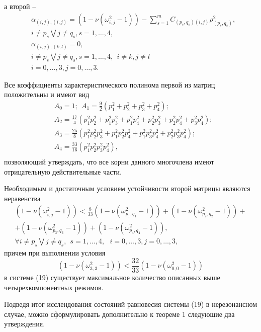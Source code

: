 \documentclass[12pt]{article}  %
\begin{document}
а второй \---
\begin{equation}
\begin{split}
&\alpha_{(i,j),(i,j)} = (1-\nu(\omega^2_{i,j}-1)) - \sum_{s=1}^{m}C_{(p_s,q_s)(i,j)}\rho^2_{(p_s,q_s)}, \\
&i\not=p_s \bigvee j\not=q_s, s=1,\dots,4,\\
&\alpha_{(i,j),(k,l)}=0,\\
&i\not=p_s \bigvee j\not=q_s, s=1,\dots,4, \ \ i\not=k, j\not=l\\
&i=0,\dots,3,j=0,\dots,3.
\end{split}
\end{equation}

Все коэффициенты характеристического полинома первой из матриц положительны и имеют вид
\begin{equation*}
\begin{split}
&A_0=1; \ \ A_1=\frac92(p_1^2+p_2^2+p_3^2+p_4^2);\\
&A_2=\frac{17}4(p_1^2p_2^2+p_1^2p_3^2+p_1^2p_4^2+p_2^2p_3^2+p_2^2p_4^2+p_3^2p_4^2);\\
&A_3=\frac{25}8(p_1^2p_2^2p_3^2+p_1^2p_2^2p_4^2+p_1^2p_3^2p_4^2+p_2^2p_3^2p_4^2);\\
&A_4=\frac{33}{16}(p_1^2p_2^2p_3^2p_4^2),\\
\end{split}
\end{equation*}
позволяющий утверждать, что все корни данного многочлена имеют отрицательную действительные части.

Необходимым и достаточным условием устойчивости второй матрицы являются неравенства
\begin{multline}
(1-\nu(\omega^2_{i,j}-1))<\frac{8}{33}(1-\nu(\omega^2_{p_1,q_1}-1))+(1-\nu(\omega^2_{p_2,q_2}-1))+\\
+(1-\nu(\omega^2_{p_3,q_3}-1))+(1-\nu(\omega^2_{p_4,q_4}-1)),\\
\forall i\not=p_s \bigvee j\not=q_s,\ \ s=1,\dots,4, \ \ \ i=0,\dots,3,j=0,\dots,3,
\end{multline}
причем при выполнении условия
\begin{equation}
(1-\nu(\omega^2_{3,3}-1))<\frac{32}{33}(1-\nu(\omega^2_{0,0}-1))
\end{equation}
в системе (19) существует максимальное количество описанных выше четырехкомпонентных режимов.

Подведя итог исслендования состояний равновесия системы (19) в нерезонансном случае, можно сформулировать дополнительно к теореме 1 следующие два утверждения.
\end{document}
